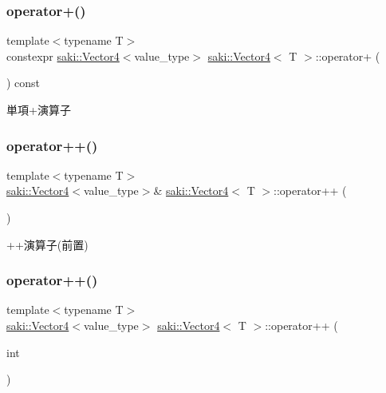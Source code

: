 \subsubsection{\texorpdfstring{operator+()}{operator+()}}
{\footnotesize\ttfamily template$<$typename T$>$ \\
constexpr \mbox{\hyperlink{classsaki_1_1_vector4}{saki\+::\+Vector4}}$<$value\+\_\+type$>$ \mbox{\hyperlink{classsaki_1_1_vector4}{saki\+::\+Vector4}}$<$ T $>$\+::operator+ (\begin{DoxyParamCaption}{ }\end{DoxyParamCaption}) const\hspace{0.3cm}{\ttfamily [inline]}}



単項+演算子 

\mbox{\label{classsaki_1_1_vector4_a132345ec0ca3c521a8b69dafcd63253a}} 
\subsubsection{\texorpdfstring{operator++()}{operator++()}\hspace{0.1cm}{\footnotesize\ttfamily [1/2]}}
{\footnotesize\ttfamily template$<$typename T$>$ \\
\mbox{\hyperlink{classsaki_1_1_vector4}{saki\+::\+Vector4}}$<$value\+\_\+type$>$\& \mbox{\hyperlink{classsaki_1_1_vector4}{saki\+::\+Vector4}}$<$ T $>$\+::operator++ (\begin{DoxyParamCaption}{ }\end{DoxyParamCaption})\hspace{0.3cm}{\ttfamily [inline]}}



++演算子(前置) 

\mbox{\label{classsaki_1_1_vector4_a3392e217f2c88b59a6b1909af8d225d6}} 
\subsubsection{\texorpdfstring{operator++()}{operator++()}\hspace{0.1cm}{\footnotesize\ttfamily [2/2]}}
{\footnotesize\ttfamily template$<$typename T$>$ \\
\mbox{\hyperlink{classsaki_1_1_vector4}{saki\+::\+Vector4}}$<$value\+\_\+type$>$ \mbox{\hyperlink{classsaki_1_1_vector4}{saki\+::\+Vector4}}$<$ T $>$\+::operator++ (\begin{DoxyParamCaption}\item[{int}]{ }\end{DoxyParamCaption})\hspace{0.3cm}{\ttfamily [inline]}}



